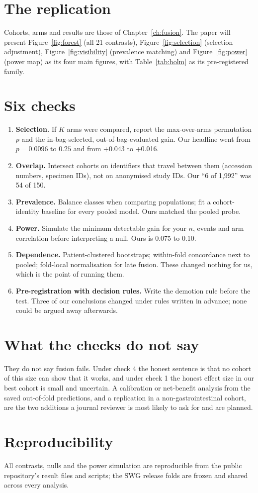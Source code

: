 \section{The replication}
Cohorts, arms and results are those of Chapter~\ref{ch:fusion}. The paper will present Figure~\ref{fig:forest} (all 21 contrasts), Figure~\ref{fig:selection} (selection adjustment), Figure~\ref{fig:visibility} (prevalence matching) and Figure~\ref{fig:power} (power map) as its four main figures, with Table~\ref{tab:holm} as its pre-registered family.

\section{Six checks}
\begin{enumerate}
\item \textbf{Selection.} If $K$ arms were compared, report the max-over-arms permutation $p$ and the in-bag-selected, out-of-bag-evaluated gain. Our headline went from $p=0.0096$ to $0.25$ and from +0.043 to +0.016.
\item \textbf{Overlap.} Intersect cohorts on identifiers that travel between them (accession numbers, specimen IDs), not on anonymised study IDs. Our ``6 of 1,992'' was 54 of 150.
\item \textbf{Prevalence.} Balance classes when comparing populations; fit a cohort-identity baseline for every pooled model. Ours matched the pooled probe.
\item \textbf{Power.} Simulate the minimum detectable gain for your $n$, events and arm correlation before interpreting a null. Ours is 0.075 to 0.10.
\item \textbf{Dependence.} Patient-clustered bootstraps; within-fold concordance next to pooled; fold-local normalisation for late fusion. These changed nothing for us, which is the point of running them.
\item \textbf{Pre-registration with decision rules.} Write the demotion rule before the test. Three of our conclusions changed under rules written in advance; none could be argued away afterwards.
\end{enumerate}

\section{What the checks do not say}
They do not say fusion fails. Under check 4 the honest sentence is that no cohort of this size can show that it works, and under check 1 the honest effect size in our best cohort is small and uncertain. A calibration or net-benefit analysis from the saved out-of-fold predictions, and a replication in a non-gastrointestinal cohort, are the two additions a journal reviewer is most likely to ask for and are planned.

\section*{Reproducibility}
All contrasts, nulls and the power simulation are reproducible from the public repository's result files and scripts; the SWG release folds are frozen and shared across every analysis.
